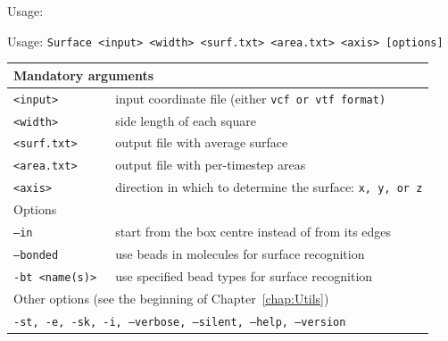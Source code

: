 Usage:

\vspace{1em}
\noindent
Usage: \tt{Surface <input> <width> <surf.txt> <area.txt> <axis> [options]}
\noindent
\begin{longtable}{p{}p{}}
  \toprule
  \multicolumn{2}{l}{Mandatory arguments} \\
  \midrule
  \tt{<input>}    & input coordinate file (either \tt{vcf} or \tt{vtf} format)\\
  \tt{<width>}    & side length of each square\\
  \tt{<surf.txt>} & output file with average surface\\
  \tt{<area.txt>} & output file with per-timestep areas\\
  \tt{<axis>}     & direction in which to determine the surface: \tt{x}, \tt{y},
    or \tt{z}\\
  \toprule
  \multicolumn{2}{l}{Options} \\
  \midrule
  \tt{--in}          & start from the box centre instead of from its edges \\
  \tt{--bonded}      & use beads in molecules for surface recognition \\
  \tt{-bt <name(s)>} & use specified bead types for surface recognition \\
  \midrule
  \multicolumn{2}{l}{Other options (see the beginning of
                     Chapter~\ref{chap:Utils})}\\
  \midrule
  \multicolumn{2}{p{0.948\textwidth}}{\tt{-st},
                                      \tt{-e},
                                      \tt{-sk},
                                      \tt{-i},
                                      \tt{--verbose},
                                      \tt{--silent},
                                      \tt{--help},
                                      \tt{--version}}\\
  \bottomrule
\end{longtable}


